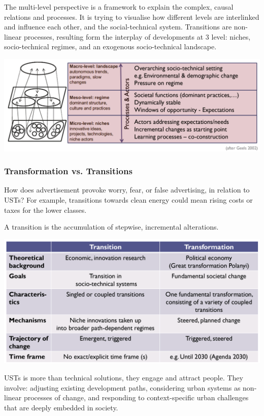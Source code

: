 \documentclass{article}
\begin{document}
The multi-level perspective is a framework to explain the complex, causal relations and processes. It is trying to visualise how different levels are interlinked and influence each other, and the social-technical system. Transitions are non-linear processes, resulting form the interplay of developments at 3 level: niches, socio-technical regimes, and an exogenous socio-technical landscape.

\includegraphics[width=\textwidth]{multi_level_perspective}

\subsubsection{Transformation vs. Transitions}

How does advertisement provoke worry, fear, or false advertising, in relation to USTs? For example, transitions towards clean energy could mean rising costs or taxes for the lower classes.

A transition is the accumulation of stepwise, incremental alterations. 

\includegraphics[width=\textwidth]{transformation_vs_transition}

USTs is more than technical solutions, they engage and attract people. They involve: adjusting existing development paths, considering urban systems as non-linear processes of change, and responding to context-specific urban challenges that are deeply embedded in society. 
\end{document}
